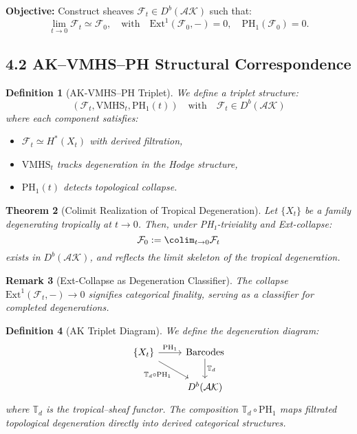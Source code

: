 \documentclass[11pt]{article}
\newtheorem{theorem}{Theorem}[section]
\newtheorem{definition}[theorem]{Definition}
\newtheorem{remark}[theorem]{Remark}
\begin{document}
\textbf{Objective:} Construct sheaves \( \mathcal{F}_t \in D^b(\mathcal{AK}) \) such that:
\[
\lim_{t \to 0} \mathcal{F}_t \simeq \mathcal{F}_0, \quad \text{with} \quad \mathrm{Ext}^1(\mathcal{F}_0, -) = 0, \quad \mathrm{PH}_1(\mathcal{F}_0) = 0.
\]

\subsection{4.2 AK--VMHS--PH Structural Correspondence}

\begin{definition}[AK-VMHS--PH Triplet]
We define a triplet structure:
\[
(\mathcal{F}_t, \mathrm{VMHS}_t, \mathrm{PH}_1(t)) \quad \text{with} \quad \mathcal{F}_t \in D^b(\mathcal{AK})
\]
where each component satisfies:
\begin{itemize}
    \item \( \mathcal{F}_t \simeq H^*(X_t) \) with derived filtration,
    \item \( \mathrm{VMHS}_t \) tracks degeneration in the Hodge structure,
    \item \( \mathrm{PH}_1(t) \) detects topological collapse.
\end{itemize}
\end{definition}

\begin{theorem}[Colimit Realization of Tropical Degeneration]
Let \( \{X_t\} \) be a family degenerating tropically at \( t \to 0 \). Then, under PH₁-triviality and Ext-collapse:
\[
\mathcal{F}_0 := \colim_{t \to 0} \mathcal{F}_t
\]
exists in \( D^b(\mathcal{AK}) \), and reflects the limit skeleton of the tropical degeneration.
\end{theorem}

\begin{remark}[Ext-Collapse as Degeneration Classifier]
The collapse \( \mathrm{Ext}^1(\mathcal{F}_t, -) \to 0 \) signifies categorical finality, serving as a classifier for completed degenerations.
\end{remark}

\begin{definition}[AK Triplet Diagram]
We define the degeneration diagram:
\[
\begin{tikzcd}
\{X_t\} \arrow[r, "\mathrm{PH}_1"] \arrow[dr, swap, "\mathbb{T}_d \circ \mathrm{PH}_1"] & \text{Barcodes} \arrow[d, "\mathbb{T}_d"] \\
& D^b(\mathcal{AK})
\end{tikzcd}
\]
where $\mathbb{T}_d$ is the tropical--sheaf functor. The composition $\mathbb{T}_d \circ \mathrm{PH}_1$ maps filtrated topological degeneration directly into derived categorical structures.
\end{definition}
\end{document}
